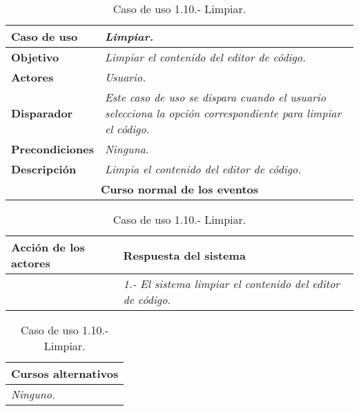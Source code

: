 \documentclass[twoside,a4paper,11pt]{book}
\begin{document}
\begin{table}[!ht]
    \centering
    \begin{tabular}{|p{4cm}|p{11.5cm}|}
    \hline

    \textbf{Caso de uso} & \textit{Limpiar.}\\
    \hline

    \textbf{Objetivo} & \textit{Limpiar el contenido del editor de código.}\\
    \hline

    \textbf{Actores} & \textit{Usuario.}\\
    \hline

    \textbf{Disparador} & \textit{Este caso de uso se dispara cuando el usuario selecciona la opción correspondiente para limpiar el código.}\\
    \hline

    \textbf{Precondiciones} & \textit{Ninguna.}\\
    \hline

    \textbf{Descripción} & \textit{Limpia el contenido del editor de código.}\\
    \hline

    \multicolumn{2}{|c|}{\textbf{Curso normal de los eventos}}\\
    \hline

    \end{tabular}
    \begin{tabular}{|p{7.75cm}|p{7.75cm}|}
    \hspace{2cm}\textbf{Acción de los actores} & \hspace{1.75cm}\textbf{Respuesta del sistema}\\
    \hline

    &
    \textit{1.- El sistema limpiar el contenido del editor de código.}
    \\
    \hline
    \end{tabular}

    \begin{tabular}{|p{15.9cm}|}
      \hspace{6cm}\textbf{Cursos alternativos}\\
      \hline     
	\textit{Ninguno.}
      \\
      \hline
    \end{tabular}
    \caption{Caso de uso 1.10.- Limpiar.}
\end{table}
\end{document}
